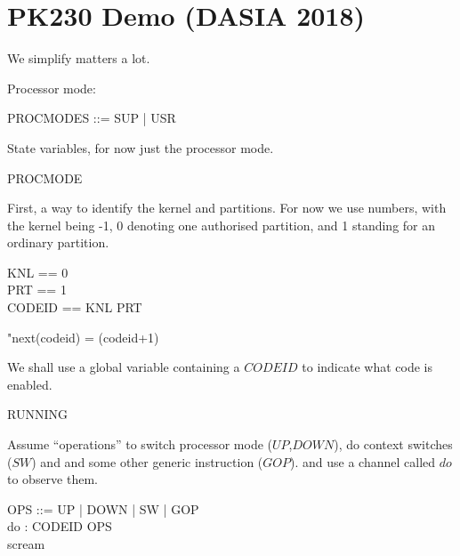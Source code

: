 \chapter{PK230 Demo (DASIA 2018)}

We simplify matters a lot.


Processor mode:
\begin{circus}
   PROCMODES ::= SUP | USR
\end{circus}

State variables, for now just the processor mode.
\begin{circus}
PROCMODE 
\end{circus}

First, a way to identify the kernel and partitions.
For now we use numbers, with the kernel being -1,
0 denoting one authorised partition,
and 1 standing for an ordinary partition.
\begin{circus}
   KNL    == 0
\\ PRT    == 1
\\ CODEID == KNL \upto PRT
\end{circus}
\begin{assert}
"next(codeid) = (codeid+1) %
\end{assert}

We shall use a global variable containing a $CODEID$ to indicate
what code is enabled.
\begin{circus}
RUNNING 
\end{circus}

Assume ``operations'' to switch processor mode ($UP$,$DOWN$),
do context switches ($SW$)
and and some other generic instruction ($GOP$).
and use a channel called $do$ to observe them.
\begin{circus}
   OPS ::= UP | DOWN | SW | GOP
\\ \circchannel do : CODEID \cross OPS
\\ \circchannel scream
\end{circus}


